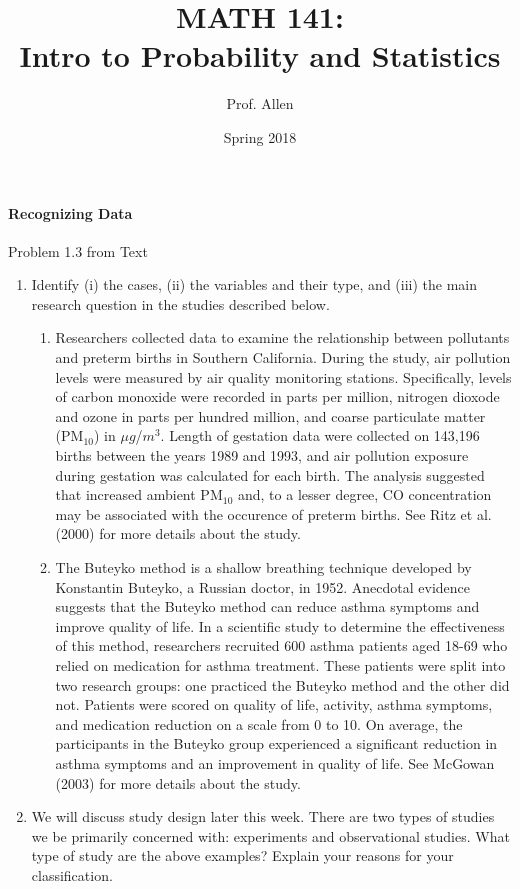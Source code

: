 \documentclass[10pt]{article}\usepackage[]{graphicx}\usepackage[]{color}
\title{MATH 141:\\Intro to Probability and Statistics}
\author{Prof. Allen}
\date{Spring 2018}
\begin{document}

\paragraph{Recognizing Data}



Problem 1.3 from Text

\begin{enumerate}

	\item Identify (i) the cases, (ii) the variables and their type, and (iii) the main research question in the studies described below.

	\begin{enumerate}

		\item Researchers collected data to examine the relationship between pollutants and preterm births in Southern California.  During the study, air pollution levels were measured by air quality monitoring stations.  Specifically, levels of carbon monoxide were recorded in parts per million, nitrogen dioxode and ozone in parts per hundred million, and coarse particulate matter (PM$_{10}$) in $\mu g $/$m^{3}$.  Length of gestation data were collected on 143,196 births between the years 1989 and 1993, and air pollution exposure during gestation was calculated for each birth.  The analysis suggested that increased ambient PM$_{10}$ and, to a lesser degree, CO concentration may be associated with the occurence of preterm births. See Ritz et al. (2000) for more details about the study.

		\item The Buteyko method is a shallow breathing technique developed by Konstantin Buteyko, a Russian doctor, in 1952.  Anecdotal evidence suggests that the Buteyko method can reduce asthma symptoms and improve quality of life.  In a scientific study to determine the effectiveness of this method, researchers recruited 600 asthma patients aged 18-69 who relied on medication for asthma treatment.  These patients were split into two research groups: one practiced the Buteyko method and the other did not.  Patients were scored on quality of life, activity, asthma symptoms, and medication reduction on a scale from 0 to 10.  On average, the participants in the Buteyko group experienced a significant reduction in asthma symptoms and an improvement in quality of life. See McGowan (2003) for more details about the study.

	\end{enumerate}

	\item We will discuss study design later this week.  There are two types of studies we be primarily concerned with: experiments and observational studies.  What type of study are the above examples?  Explain your reasons for your classification.

\end{enumerate}
\end{document}
